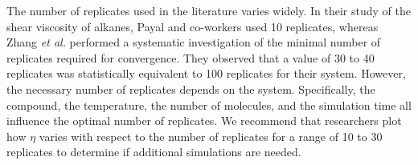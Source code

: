 \documentclass[9pt,bestpractices]{livecoms}
\begin{document}
The number of replicates used in the literature varies widely. In their study of the shear viscosity of alkanes, Payal and co-workers \cite{Payal2012} used 10 replicates, whereas Zhang \textit{et al.} \cite{Zhang2015} performed a systematic investigation of the minimal number of replicates required for convergence. They observed that a value of 30 to 40 replicates was statistically equivalent to 100 replicates for their system. However, the necessary number of replicates depends on the system. Specifically, the compound, the temperature, the number of molecules, and the simulation time all influence the optimal number of replicates. We recommend that researchers plot how $\eta$ varies with respect to the number of replicates for a range of 10 to 30 replicates to determine if additional simulations are needed.

\end{document}
